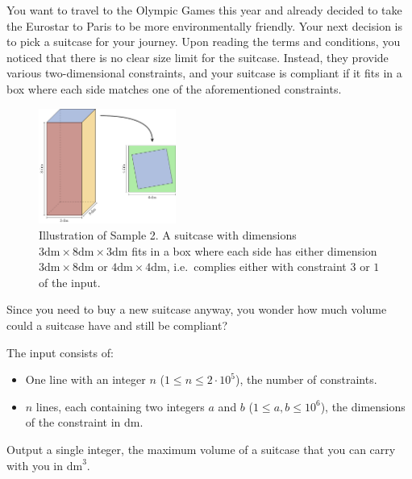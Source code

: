 \problemname{\problemyamlname}

%
You want to travel to the Olympic Games this year and already decided to take the Eurostar to Paris to be more environmentally friendly.
Your next decision is to pick a suitcase for your journey.
Upon reading the terms and conditions, you noticed that there is no clear size limit for the suitcase.
Instead, they provide various two-dimensional constraints, and your suitcase is compliant if it fits in a box where each side matches one of the aforementioned constraints.

\begin{figure}[!h]
	\centering
	\includegraphics[width=0.4\textwidth]{sample2}
	\caption{Illustration of Sample 2.
		A suitcase with dimensions $3 \textrm{dm}\times8 \textrm{dm}\times3 \textrm{dm}$ fits in a box where each side has either dimension $3\textrm{dm}\times8\textrm{dm}$ or $4\textrm{dm}\times4\textrm{dm}$, i.e.\ complies either with constraint $3$ or $1$ of the input.}
\end{figure}

Since you need to buy a new suitcase anyway, you wonder how much volume could a suitcase have and still be compliant?

\begin{Input}
	The input consists of:
	\begin{itemize}
		\item One line with an integer $n$ ($1\leq n\leq 2\cdot10^5$),
		the number of constraints.
		\item $n$ lines, each containing two integers $a$ and $b$ ($1\leq a,b\leq10^6$), the dimensions of the constraint in $\textrm{dm}$.
	\end{itemize}
\end{Input}
\begin{Output}
	Output a single integer, the maximum volume of a suitcase that you can carry with you in $\textrm{dm}^3$.
\end{Output}
